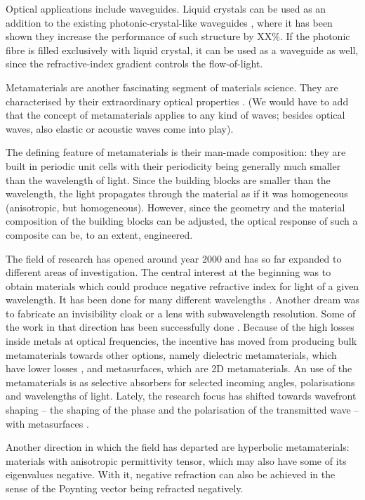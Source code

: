 \documentclass[a4paper,10pt]{article}
\begin{document}
Optical applications include waveguides. 
Liquid crystals can be used as an addition to the existing photonic-crystal-like waveguides \cite{dd}, where it has been shown they increase the performance of such structure by XX\%. 
If the photonic fibre is filled exclusively with liquid crystal, it can be used as a waveguide as well, since the refractive-index gradient controls the flow-of-light. 





Metamaterials are another fascinating segment of materials science. 
They are characterised by their extraordinary optical properties \cite{gja}.
(We would have to add that the concept of metamaterials applies to any kind of waves; besides optical waves, also elastic or acoustic waves come into play). 

The defining feature of metamaterials is their man-made composition: they are built in periodic unit cells with their periodicity being generally much smaller than the wavelength of light. 
Since the building blocks are smaller than the wavelength, the light propagates through the material as if it was homogeneous (anisotropic, but homogeneous). 
However, since the geometry and the material composition of the building blocks can be adjusted, the optical response of such a composite can be, to an extent, engineered. 

The field of research has opened around year 2000 \cite{koak} and has so far expanded to different areas of investigation. 
The central interest at the beginning was to obtain materials which could produce negative refractive index for light of a given wavelength. 
It has been done for many different wavelengths \cite{pwqo}. 
Another dream was to fabricate an invisibility cloak or a lens with subwavelength resolution. 
Some of the work in that direction has been successfully done \cite{lal, ei}. 
Because of the high losses inside metals at optical frequencies, the incentive has moved from producing bulk metamaterials towards other options, namely dielectric metamaterials, which have lower losses \cite{}, and metasurfaces, which are 2D metamaterials. 
An use of the metamaterials is as selective absorbers for selected incoming angles, polarisations and wavelengths of light. 
Lately, the research focus has shifted towards wavefront shaping -- the shaping of the phase and the polarisation of the transmitted wave -- with metasurfaces \cite{}.  

Another direction in which the field has departed are hyperbolic metamaterials: materials with anisotropic permittivity tensor, which may also have some of its eigenvalues negative. 
With it, negative refraction can also be achieved in the sense of the Poynting vector being refracted negatively.
\end{document}
